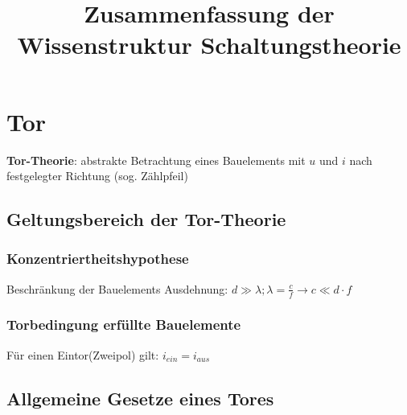 \documentclass{article}
\title{Zusammenfassung der Wissenstruktur Schaltungstheorie}
\begin{document}
    \maketitle
    \pagebreak
    \tableofcontents
    \pagebreak
    \section{Tor}
    \textbf{Tor-Theorie}: abstrakte Betrachtung eines Bauelements mit $u$ und $i$ nach festgelegter Richtung (sog. Zählpfeil)
    \subsection{Geltungsbereich der Tor-Theorie}
    \subsubsection*{Konzentriertheitshypothese}
    Beschränkung der Bauelements Ausdehnung: $d \gg \lambda; \lambda = \frac{c}{f}\rightarrow c\ll d\cdot f$
    \subsubsection*{Torbedingung erfüllte Bauelemente}
    Für einen Eintor(Zweipol) gilt: $i_{ein} = i_{aus}$
    \subsection{Allgemeine Gesetze eines Tores}

    
\end{document}
